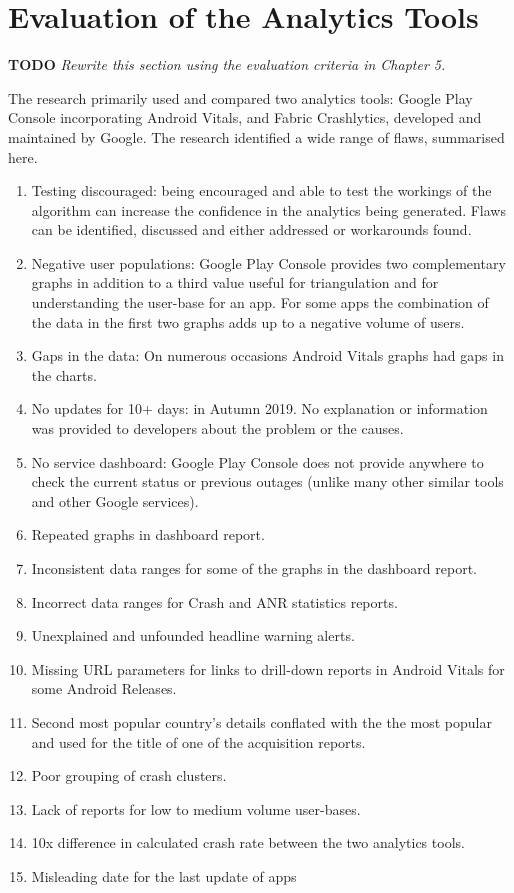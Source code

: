 \section{Evaluation of the Analytics Tools}

\textbf{TODO} \textit{Rewrite this section using the evaluation criteria in Chapter 5.}

The research primarily used and compared two analytics tools: Google Play Console incorporating Android Vitals, and Fabric Crashlytics, developed and maintained by Google. The research identified a wide range of flaws, summarised here.

\begin{enumerate}
    \item Testing discouraged: being encouraged and able to test the workings of the algorithm can increase the confidence in the analytics being generated. Flaws can be identified, discussed and either addressed or workarounds found.
    \item Negative user populations: Google Play Console provides two complementary graphs in addition to a third value useful for triangulation and for understanding the user-base for an app. For some apps the combination of the data in the first two graphs adds up to a negative volume of users.
    \item Gaps in the data: On numerous occasions Android Vitals graphs had gaps in the charts.
    \item No updates for 10+ days: in Autumn 2019. No explanation or information was provided to developers about the problem or the causes. %
    \item No service dashboard: Google Play Console does not provide anywhere to check the current status or previous outages (unlike many other similar tools and other Google services).
    \item Repeated graphs in dashboard report.
    \item Inconsistent data ranges for some of the graphs in the dashboard report.
    \item Incorrect data ranges for Crash and ANR statistics reports.
    \item Unexplained and unfounded headline warning alerts.
    \item Missing URL parameters for links to drill-down reports in Android Vitals for some Android Releases.
    \item Second most popular country's details conflated with the the most popular and used for the title of one of the acquisition reports.
    \item Poor grouping of crash clusters.
    \item Lack of reports for low to medium volume user-bases.
    \item 10x difference in calculated crash rate between the two analytics tools.
    \item Misleading date for the last update of apps
\end{enumerate}

